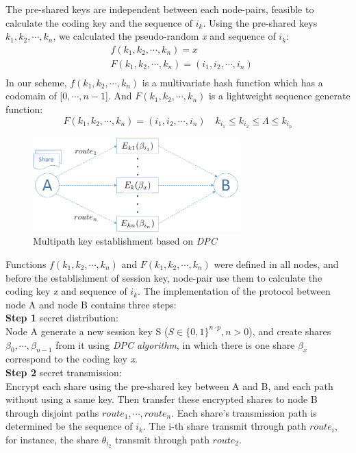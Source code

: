 \documentclass[nocopyrightspace,9pt]{sigplanconf}
\begin{document}
The pre-shared keys are independent between each node-pairs, feasible to calculate the coding key
and the sequence of $i_k$.
Using the pre-shared keys $k_1,k_2,\cdots,k_n$, we calculated the pseudo-random \textit{x}
and sequence of $i_k$:
\begin{equation}\label{func_f}
  \begin{split}
    &f(k_1,k_2,\cdots,k_n)=x\\
    &F(k_1,k_2,\cdots,k_n)=(i_1,i_2,\cdots,i_n)\\
  \end{split}
\end{equation}
In our scheme, $f(k_1,k_2,\cdots,k_n)$ is a multivariate hash function which has a codomain of [$0,\cdots,n-1$]. And $F(k_1,k_2,\cdots,k_n)$ is a lightweight sequence generate function:
\[F(k_1,k_2,\cdots,k_n)=(i_1,i_2,\cdots,i_n)\quad k_{i_1}\leq k_{i_2} \leq \Lambda \leq k_{i_n}\]
\begin{figure}[htbp]
\centering
\includegraphics[width=80mm]{key.png}
\caption{Multipath key establishment based on \textit{DPC} }
\label{fig:key}
\end{figure}

Functions $f(k_1,k_2,\cdots,k_n)$ and $F(k_1,k_2,\cdots,k_n)$ were defined in all nodes, and before the
establishment of session key, node-pair use them to calculate the coding key \textit{x} and sequence of
$i_k$. The implementation of the protocol between node A
and node B contains three steps:\\

\noindent\textbf{Step 1} secret distribution:\\
Node A generate a new session key S ($S\in\{0,1\}^{n\cdot p},n>0$), and
create shares $\beta_0,\cdots,\beta_{n-1}$ from it using \textit{DPC algorithm},
in which there is one share $\beta_x$ correspond to the coding key \textit{x}.\\

\noindent\textbf{Step 2} secret transmission:\\
Encrypt each share using the pre-shared key between A and B, and each path without
using a same key. Then transfer these
encrypted shares to node B through disjoint paths $route_1,\cdots,route_n$.
Each share's transmission path is determined be the sequence of $i_k$. The i-th share
transmit through path $route_i$, for instance, the share
$\theta_{i_2}$ transmit through path $route_2$.\\
\end{document}

